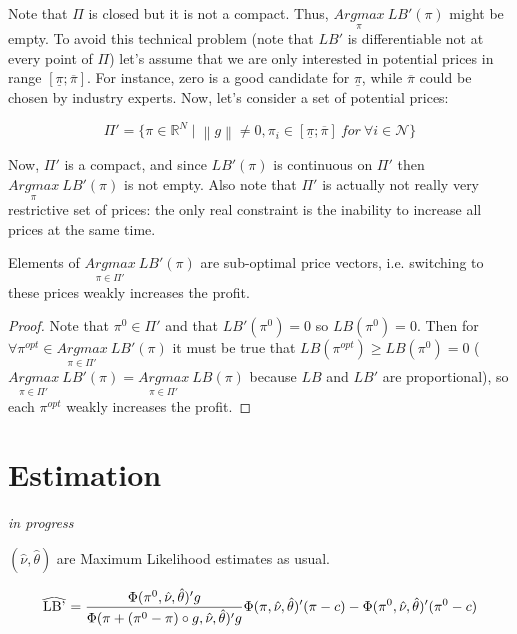 \documentclass[12pt]{article}
\newcommand\reallywidehat[1]{%
\savestack{\tmpbox}{\stretchto{%
  \scaleto{%
    \scalerel*[\widthof{\ensuremath{#1}}]{\kern-.6pt\bigwedge\kern-.6pt}%
    {\rule[-\textheight/2]{1ex}{\textheight}}%
  }{\textheight}%
}{0.5ex}}%
\stackon[1pt]{#1}{\tmpbox}%
}
\newcommand\norm[1]{\left\lVert#1\right\rVert}
\begin{document}
Note that $\Pi$ is closed but it is not a compact.
Thus, $\underset{\pi}{Argmax} \: LB'(\pi)$ might be empty.
To avoid this technical problem (note that $LB'$ is differentiable not at every point of $\Pi$) let's assume that we are only interested in potential prices in range $[\underline{\pi} ; \overline{\pi}]$.
For instance, zero is a good candidate for $\underline{\pi}$, while $\overline{\pi}$ could be chosen by industry experts.
Now, let's consider a set of potential prices:


\begin{equation*}
\Pi' = \{\pi \in  \mathbb{R}^N \mid \norm{g} \neq 0 , \pi_i \in [\underline{\pi} ; \overline{\pi}] \:  for \:  \forall i \in \mathcal{N} \}
\end{equation*}

Now, $\Pi'$ is a compact, and since $LB'(\pi)$ is continuous on $\Pi'$ then $\underset{\pi}{Argmax} \: LB'(\pi)$  is not empty.
Also note that $\Pi'$ is actually not really very restrictive set of prices: the only real constraint is the inability to increase all prices at the same time.

\begin{proposition}\label{proposition:2}
Elements of $\underset{\pi \in \Pi'}{Argmax} \: LB'(\pi)$ are sub-optimal price vectors, i.e. switching to these prices weakly increases the profit.
\end{proposition}
\begin{proof}
Note that $\pi^0 \in \Pi'$ and that $LB'(\pi^0)=0$ so $LB(\pi^0)=0$. Then for $\forall \pi^{opt} \in \underset{\pi \in \Pi'}{Argmax} \: LB'(\pi)$ it must be true that $LB(\pi^{opt}) \geq LB(\pi^0)=0$ ($\underset{\pi \in \Pi'}{Argmax} \: LB'(\pi) = \underset{\pi \in \Pi'}{Argmax} \: LB(\pi)$ because $LB$ and $LB'$ are proportional), so each $\pi^{opt}$ weakly increases the profit.
\end{proof}

\section{Estimation}
\textit{in progress}

$(\hat{\nu}, \hat{\theta})$ are Maximum Likelihood estimates as usual.


\begin{equation*}
\reallywidehat{LB'} = \frac{ \Phi(\pi^0,\hat{\nu}, \hat{\theta})' g}{\Phi(\pi + (\pi^0 - \pi) \circ g,\hat{\nu},\hat{ \theta})' g} \Phi(\pi,\hat{\nu}, \hat{\theta})' (\pi-c) - \Phi(\pi^0,\hat{\nu}, \hat{\theta})' (\pi^0 -c )
\end{equation*}
\end{document}
